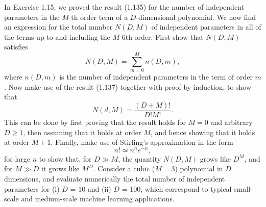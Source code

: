 \begin{cBoxA}{}
 In Exercise 1.15, we proved the result (1.135) for the number of
independent parameters in the $M$-th order term of a $D$-dimensional
polynomial. We now find an expression for the total number $N(D,M)$
of independent parameters in all of the terms up to and including
the $M$ 6th order. First show that $N(D,M)$ satisfies 
\[
N(D,M)=\sum_{m=0}^{M}n(D,m),
\]
where $n(D,m)$ is the number of independent parameters in the term
of order $m$. Now make use of the result (1.137) together with proof
by induction, to show that 
\[
N(d,M)=\frac{(D+M)!}{D!M!}.
\]
This can be done by first proving that the result holds for $M=0$
and arbitrary $D\geq1$, then assuming that it holds at order $M$,
and hence showing that it holds at order $M+1$. Finally, make use
of Stirling\textquoteright s approximation in the form 
\[
n!\simeq n^{n}e^{-n},
\]
for large $n$ to show that, for $D\gg M$, the quantity $N(D,M)$
grows like $D^{M}$, and for $M\gg D$ it grows like $M^{D}$. Consider
a cubic ($M=3$) polynomial in $D$ dimensions, and evaluate numerically
the total number of independent parameters for (i) $D$ = 10 and (ii)
$D$ = 100, which correspond to typical small-scale and medium-scale
machine learning applications.
\end{cBoxA}

